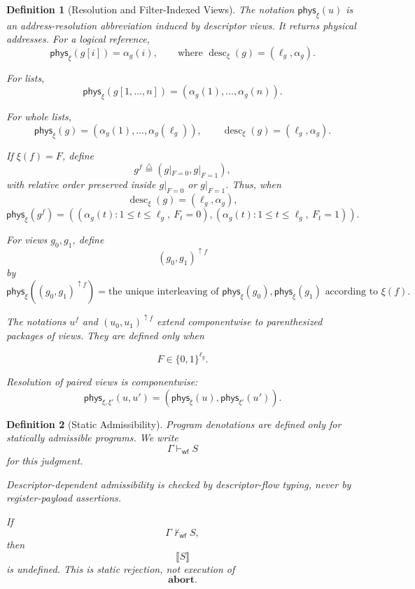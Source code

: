 \documentclass[acmsmall,screen,review,anonymous,nonacm]{acmart}
\newtheorem{definition}{Definition}[section]
\theoremstyle{defn_style}
\newcommand{\sem}[1]{\llbracket #1 \rrbracket}
\begin{document}
    \begin{definition}[Resolution and Filter-Indexed Views]
      The notation \(\mathsf{phys}_{\xi}(u)\) is an address-resolution abbreviation induced by descriptor views. It returns physical addresses. For a logical reference,
      \[
      \mathsf{phys}_{\xi}(g[i])
      =
      \alpha_g(i),
      \qquad
      \text{where }
      \operatorname{desc}_{\xi}(g)=(\ell_g,\alpha_g).
      \]
      
      For lists,
      \[
      \mathsf{phys}_{\xi}(g[1,\ldots,n])
      =
      (\alpha_g(1),\ldots,\alpha_g(n)).
      \]

      For whole lists,
\[
\mathsf{phys}_{\xi}(g)
=
(\alpha_g(1),\ldots,\alpha_g(\ell_g)),
\qquad
\operatorname{desc}_{\xi}(g)=(\ell_g,\alpha_g).
\]
      
      If \(\xi(f)=F\), define
      \[
      g^{f}
      \stackrel{\triangle}{=}
      (g|_{F=0},g|_{F=1}),
      \]
      with relative order preserved inside \(g|_{F=0}\) or \(g|_{F=1}\). Thus, when
      \[
      \operatorname{desc}_{\xi}(g)=(\ell_g,\alpha_g),
      \]
      \[
      \mathsf{phys}_{\xi}(g^{f})
      =
      ((\alpha_g(t):1\le t\le \ell_g,\ F_t=0)
      ,(\alpha_g(t):1\le t\le \ell_g,\ F_t=1)).
      \]
      
      For views \(g_0,g_1\), define
      \[
      (g_0,g_1)^{\uparrow f}
      \]
      by
      \[
      \mathsf{phys}_{\xi}((g_0,g_1)^{\uparrow f})
      =
      \text{the unique interleaving of }
      \mathsf{phys}_{\xi}(g_0),
      \mathsf{phys}_{\xi}(g_1)
      \text{ according to }\xi(f).
      \]
      
      The notations \(u^{f}\) and \((u_0,u_1)^{\uparrow f}\) extend componentwise to
parenthesized packages of views. They are defined only when

\[
F\in\{0,1\}^{\ell_g}.
\]

      Resolution of paired views is componentwise:
      \[
      \mathsf{phys}_{\xi,\xi'}(u,u')
      =
      \left(
      \mathsf{phys}_{\xi}(u),
      \mathsf{phys}_{\xi'}(u')
      \right).
      \]
      \end{definition}

      \begin{definition}[Static Admissibility]
        Program denotations are defined only for statically admissible programs. We
        write
        \[
        \Gamma\vdash_{\mathsf{wf}} S
        \]
        for this judgment.
        

Descriptor-dependent admissibility is checked by descriptor-flow typing, never
by register-payload assertions.
        
        If
        \[
        \Gamma\not\vdash_{\mathsf{wf}} S,
        \]
        then
        \[
        \sem S
        \]
        is undefined. This is static rejection, not execution of
        \[
        \mathbf{abort}.
        \]
        \end{definition}
\end{document}
